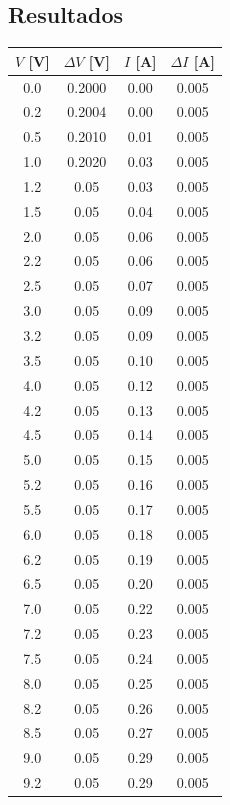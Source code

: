 \documentclass[12pt]{article}
\begin{document}
\subsection{Resultados}
\begin{table}[htbp]
    \centering
    \begin{tabular}{|c|c|c|c|}
        \hline
        $V$ [V] & $\Delta V$ [V] & $I$ [A] & $\Delta I$ [A] \\
        \hline\hline
         0.0& 0.2000& 0.00& 0.005 \\
         0.2& 0.2004& 0.00& 0.005\\
         0.5& 0.2010& 0.01& 0.005\\
         1.0& 0.2020& 0.03& 0.005\\
         1.2& 0.05& 0.03& 0.005\\
         1.5& 0.05& 0.04& 0.005\\
         2.0& 0.05& 0.06& 0.005\\
         2.2& 0.05& 0.06& 0.005\\
         2.5& 0.05& 0.07& 0.005\\
         3.0& 0.05& 0.09& 0.005\\
         3.2& 0.05& 0.09& 0.005\\
         3.5& 0.05& 0.10& 0.005\\
         4.0& 0.05& 0.12& 0.005\\
         4.2& 0.05& 0.13& 0.005\\
         4.5& 0.05& 0.14& 0.005\\
         5.0& 0.05& 0.15& 0.005\\
         5.2& 0.05& 0.16& 0.005\\
         5.5& 0.05& 0.17& 0.005\\
         6.0& 0.05& 0.18& 0.005\\
         6.2& 0.05& 0.19& 0.005\\
         6.5& 0.05& 0.20& 0.005\\
         7.0& 0.05& 0.22& 0.005\\
         7.2& 0.05& 0.23& 0.005\\
         7.5& 0.05& 0.24& 0.005\\
         8.0& 0.05& 0.25& 0.005\\
         8.2& 0.05& 0.26& 0.005\\
         8.5& 0.05& 0.27& 0.005\\
         9.0& 0.05& 0.29& 0.005\\
         9.2& 0.05& 0.29& 0.005\\

\end{tabular}
\end{table}
\end{document}

